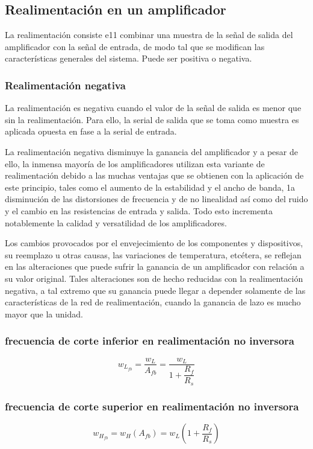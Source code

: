 \subsection{Realimentación en un amplificador}

La realimentación consiste e11 combinar una muestra de la señal de salida del amplificador con la señal de entrada, de modo tal que se modifican las características generales del sistema. Puede ser positiva o negativa.

\subsubsection{Realimentación negativa}

La realimentación es negativa cuando el valor de la señal de salida es menor que sin la realimentación. Para ello, la serial de salida que se toma como muestra es aplicada opuesta en fase a la serial de entrada.

La realimentación negativa disminuye la ganancia del amplificador y a pesar de ello, la inmensa mayoría de los amplificadores utilizan esta variante de realimentación debido a las muchas ventajas que se obtienen con la aplicación de este principio, tales como el aumento
de la estabilidad y el ancho de banda, 1a disminución de las distorsiones de frecuencia y de no linealidad así como del ruido y el cambio en las resistencias de entrada y salida. Todo esto incrementa notablemente la calidad y versatilidad de los amplificadores.

Los cambios provocados por el envejecimiento de los componentes y dispositivos, su reemplazo u otras causas, las variaciones de temperatura, etcétera, se reflejan en las alteraciones que puede sufrir la ganancia de un amplificador con relación a su valor original. Tales
alteraciones son de hecho reducidas con la realimentación negativa, a tal extremo que su ganancia puede llegar a depender solamente de las características de la red de realimentación, cuando la ganancia de lazo es mucho mayor que la unidad.


\subsubsection{frecuencia de corte inferior en realimentación no inversora}
\begin{equation}
    w_{L_{fb}}=\dfrac{w_L}{A_{fb}}=\dfrac{w_L}{1+\dfrac{R_f}{R_s}}
    \label{eqn:wlfb}
\end{equation}
\subsubsection{frecuencia de corte superior en realimentación no inversora}
\begin{equation}
    w_{H_{fb}}=w_H(A_{fb})=w_L(1+\dfrac{R_f}{R_s})
    \label{eqn:whfb}
\end{equation}

